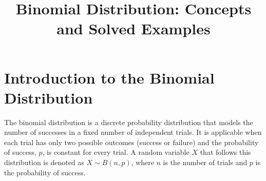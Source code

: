 \documentclass{article}
\begin{document}
\title{Binomial Distribution: Concepts and Solved Examples}
\author{}
\date{}
\maketitle

\section*{Introduction to the Binomial Distribution}
The binomial distribution is a discrete probability distribution that models the number of successes in a fixed number of independent trials. It is applicable when each trial has only two possible outcomes (success or failure) and the probability of success, $p$, is constant for every trial. A random variable $X$ that follows this distribution is denoted as $X \sim B(n, p)$, where $n$ is the number of trials and $p$ is the probability of success.
\end{document}
